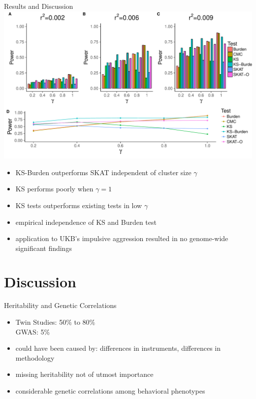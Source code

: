 \documentclass{beamer}
\begin{document}
\begin{frame}[t]{Results and Discussion}
  \tiny
  \includegraphics[width=0.8\linewidth]{../ksburden/figures/combined_power_analysis.pdf}
  \begin{itemize}
    \item KS-Burden outperforms SKAT independent of cluster size $\gamma$
    \item KS performs poorly when $\gamma=1$
    \item KS tests outperforms existing tests in low $\gamma$
    \item empirical independence of KS and Burden test
    \item application to UKB's impulsive aggression resulted in no genome-wide significant findings
  \end{itemize}
\end{frame}

\section{Discussion}

\begin{frame}[t]{Heritability and Genetic Correlations}
  \begin{itemize}
    \item Twin Studies: 50\% to 80\% \\
      GWAS: 5\%
    \item could have been caused by: differences in instruments, differences in methodology
    \item missing heritability not of utmost importance
    \item considerable genetic correlations among behavioral phenotypes
  \end{itemize}
\end{frame}
\end{document}
